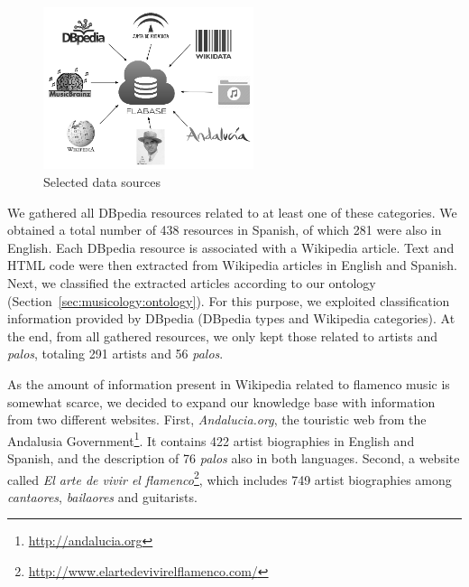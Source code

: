 \begin{figure}
	\centering
	\includegraphics[width=0.55\textwidth]{ch05_musicology_pics/datasources_bn.png}
	\caption{Selected data sources \label{fig:musicology:datasources}}
\end{figure}

We gathered all DBpedia resources related to at least one of these categories. We obtained a total number of 438 resources in Spanish, of which 281 were also in English. Each DBpedia resource is associated with a Wikipedia article. Text and HTML code were then extracted from Wikipedia articles in English and Spanish.%
Next, we classified the extracted articles according to our ontology (Section~\ref{sec:musicology:ontology}). For this purpose, we exploited classification information provided by DBpedia (DBpedia types and Wikipedia categories). At the end, from all gathered resources, we only kept those related to artists and \textit{palos}, totaling  291 artists and 56 \textit{palos}.

As the amount of information present in Wikipedia related to flamenco music is somewhat scarce, we decided to expand our knowledge base with information from two different websites. First, \textit{Andalucia.org}, the touristic web from the Andalusia Government\footnote{\url{http://andalucia.org}}. It contains 422 artist biographies in English and Spanish, and the description of 76 \textit{palos} also in both languages. Second, a website called \textit{El arte de vivir el flamenco}\footnote{\url{http://www.elartedevivirelflamenco.com/}}, which includes 749 artist biographies among \textit{cantaores}, \textit{bailaores} and guitarists. %

